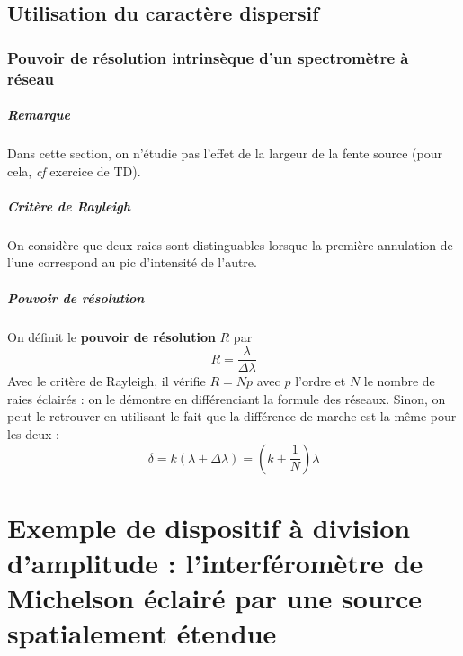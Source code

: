\documentclass[french]{book}
\theoremstyle{plain}
\theoremstyle{definition}
\theoremstyle{remark}
\begin{document}
\section{Utilisation du caractère dispersif}
\subsection{Pouvoir de résolution intrinsèque d'un spectromètre à réseau}
\paragraph{Remarque} Dans cette section, on n'étudie pas l'effet de la largeur de la fente source (pour cela, \textit{cf} exercice de TD).
\paragraph{Critère de Rayleigh} On considère que deux raies sont distinguables lorsque la première annulation de l’une correspond au pic d’intensité de l’autre.
\paragraph{Pouvoir de résolution} On définit le \textbf{pouvoir de résolution} $R$ par $$R=\frac{\lambda}{\Delta\lambda}$$ Avec le critère de Rayleigh, il vérifie $R=Np$ avec $p$ l’ordre et $N$ le nombre de raies éclairés : on le démontre en différenciant la formule des réseaux. Sinon, on peut le retrouver en utilisant le fait que la différence de marche est la même pour les deux : $$\delta=k(\lambda+\Delta\lambda)=\left(k+\frac{1}{N}\right)\lambda$$


\chapter{Exemple de dispositif à division d'amplitude : l'interféromètre de Michelson éclairé par une source spatialement étendue}
\localtableofcontents
\end{document}
